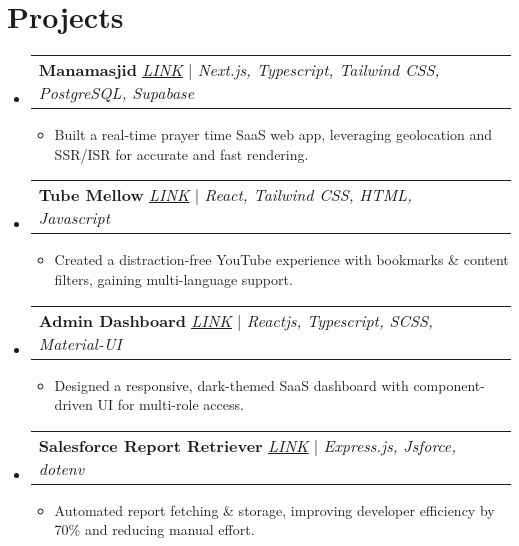 \documentclass[letterpaper,11pt]{article}
\makeatletter
\newcommand{\resumeItem}[1]{
  \item\small{
    {#1 \vspace{-2pt}}
  }
}
\newcommand{\resumeProjectHeading}[2]{
    \item
    \begin{tabular*}{0.97\textwidth}{l@{\extracolsep{\fill}}r}
      \small#1 & #2 \\
    \end{tabular*}\vspace{-7pt}
}
\newcommand{\resumeSubHeadingListStart}{\begin{itemize}[leftmargin=0.15in, label={}]}
\newcommand{\resumeSubHeadingListEnd}{\end{itemize}}
\newcommand{\resumeItemListStart}{\begin{itemize}}
\newcommand{\resumeItemListEnd}{\end{itemize}\vspace{-5pt}}
\makeatother
\begin{document}
\section{Projects}
    \resumeSubHeadingListStart
     \resumeProjectHeading
          {\textbf{Manamasjid} \href{https://manamasjid.vercel.app/}{\underline{\emph{LINK}}} | \emph{Next.js, Typescript, Tailwind CSS, PostgreSQL, Supabase}}{}
          \resumeItemListStart
            \resumeItem{Built a real-time prayer time SaaS web app, leveraging geolocation and SSR/ISR for accurate and fast rendering.}
          \resumeItemListEnd
      \resumeProjectHeading
          {\textbf{Tube Mellow} \href{https://chromewebstore.google.com/detail/tube-mellow/fgflinjcolmfjdkilakkcgennlkhgkgh}{\underline{\emph{LINK}}} | \emph{React, Tailwind CSS, HTML, Javascript}}{}
          \resumeItemListStart
            \resumeItem{Created a distraction-free YouTube experience with bookmarks \& content filters, gaining multi-language support.}
          \resumeItemListEnd
      \resumeProjectHeading
          {\textbf{Admin Dashboard} \href{https://admin-dashboard-hakeem.vercel.app/}{\underline{\emph{LINK}}} | \emph{Reactjs, Typescript, SCSS, Material-UI}}{}
          \resumeItemListStart
            \resumeItem{Designed a responsive, dark-themed SaaS dashboard with component-driven UI for multi-role access.}
          \resumeItemListEnd
      \resumeProjectHeading
          {\textbf{Salesforce Report Retriever} \href{https://github.com/hakeemsalman/Salesforce-Report-Retriever/}{\underline{\emph{LINK}}} | \emph{Express.js, Jsforce, dotenv}}{}
          \resumeItemListStart
            \resumeItem{Automated report fetching \& storage, improving developer efficiency by 70\% and reducing manual effort.}
          \resumeItemListEnd
    \resumeSubHeadingListEnd


%
\end{document}
